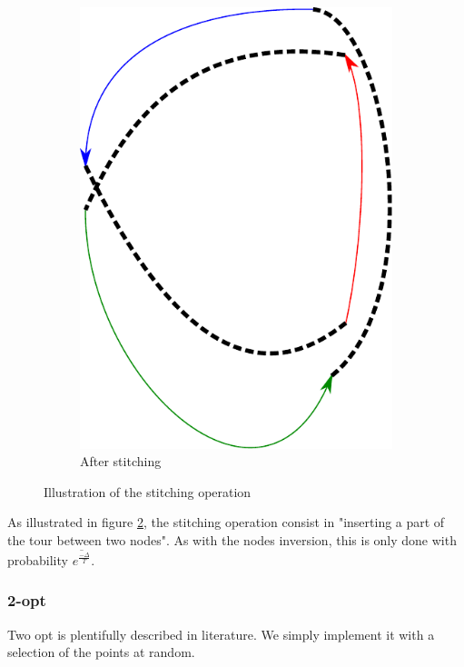 \documentclass[fontsize=9pt,twocolumns,enabledeprecatedfontcommands]{scrartcl}
\begin{document}
\begin{figure}[htbp]
\begin{subfigure}{0.4\textwidth}
		\centering
		\includegraphics[angle=90,width=\linewidth,height=0.15\textheight]{stitch2}
		\caption{After stitching}
		\label{stitch2}
		
	\end{subfigure}
	\captionsetup{format=plain}
	\caption{Illustration of the stitching operation}
	\label{stitch_fig}
\end{figure}

As illustrated in figure \ref{stitch_fig}, the stitching operation consist in "inserting a part of the tour between two nodes". As with the nodes inversion, this is only done with probability $\overline{e^{\frac{-\Delta}{T}}}$.

\subsubsection{2-opt}
Two opt is plentifully described in literature. We simply implement it with a selection of the points at random. 
\end{document}
